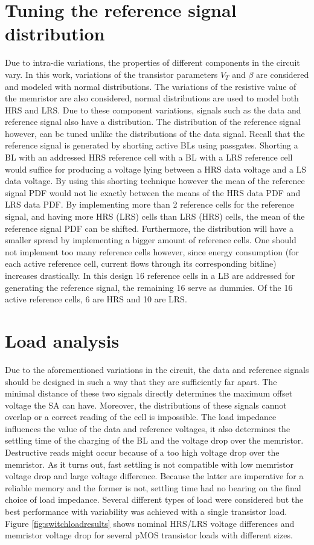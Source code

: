 \documentclass[journal]{IEEEtran}
\begin{document}
\section{Tuning the reference signal distribution}\label{ref}
Due to intra-die variations, the properties of different components in the circuit vary. In this work, variations of the transistor parameters $V_{T}$ and $\beta$ are considered and modeled with normal distributions. The variations of the resistive value of the memristor are also considered, normal distributions are used to model both HRS and LRS. Due to these component variations, signals such as the data and reference signal also have a distribution. The distribution of the reference signal however, can be tuned unlike the distributions of the data signal. Recall that the reference signal is generated by shorting active BLs using passgates. Shorting a BL with an addressed HRS reference cell with a BL with a LRS reference cell would suffice for producing a voltage lying between a HRS data voltage and a LS data voltage. By using this shorting technique however the mean of the reference signal PDF would not lie exactly between the means of the HRS data PDF and LRS data PDF. By implementing more than 2 reference cells for the reference signal, and having more HRS (LRS) cells than LRS (HRS) cells, the mean of the reference signal PDF can be shifted. Furthermore, the distribution will have a smaller spread by implementing a bigger amount of reference cells. One should not implement too many reference cells however, since energy consumption (for each active reference cell, current flows through its corresponding bitline) increases drastically. In this design 16 reference cells in a LB are addressed for generating the reference signal, the remaining 16 serve as dummies. Of the 16 active reference cells, 6 are HRS and 10 are LRS.

\section{Load analysis}\label{load}
Due to the aforementioned variations in the circuit, the data and reference signals should be designed in such a way that they are sufficiently far apart. The minimal distance of these two signals directly determines the maximum offset voltage the SA can have. Moreover, the distributions of these signals cannot overlap or a correct reading of the cell is impossible. The load impedance influences the value of the data and reference voltages, it also determines the settling time of the charging of the BL and the voltage drop over the memristor. Destructive reads might occur because of a too high voltage drop over the memristor. As it turns out, fast settling is not compatible with low memristor voltage drop and large voltage difference. Because the latter are imperative for a reliable memory and the former is not, settling time had no bearing on the final choice of load impedance. Several different types of load were considered \cite{bulkload} but the best performance with variability was achieved with a single transistor load. Figure \ref{fig:switchloadresults} shows nominal HRS/LRS voltage differences and memristor voltage drop for several pMOS transistor loads with different sizes. 
\end{document}
